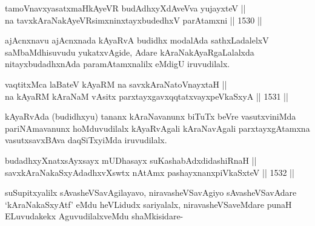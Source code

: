 
\begin{shl}
tamoVnavxyasatxmaHkAyeVR budAdhxyXdAveVva yujayxteV || \\
na tavxkAraNakAyeVR\s simxninxtayxbudedhxV parAtamxni \hfill || 1530 ||  
\end{shl}

\begin{artha}
ajAcnxnavu ajAcnxnada kAyaRvA budidhx modalAda sathxLadalelxV saMbaMdhisuvudu yukatxvAgide, Adare kAraNakAyaRgaLalalxda nitayxbudadhxnAda paramAtamxnalilx eMdigU iruvudilalx.
\end{artha}

\begin{shl}
vaqtitxM\footnotemark[1] ca laBateV kAyaRM na savxkAraNatoV\s nayxtaH ||  \\
na kAyaRM kAraNaM vA\s sitx parxtayxgavxqqtatxvayxpeVkaSxyA \hfill || 1531 ||  
\end{shl}

\begin{artha}
kAyaRvAda (budidhxyu) tananx kAraNavanunx biTuTx beVre vasutxviniMda pariNAmavanunx hoMduvudilalx kAyaRvAgali kAraNavAgali parxtayxgAtamxna vasutxsavxBAva daqSiTxyiMda iruvudilalx.
\end{artha}

\begin{shl}
budadhxyXnatxsAyxsayx mUDhasayx suKashabAdxdidashiRnaH || \\
savxkAraNakaSxyAdadhxvXswtx nA\s \s tAmx pashayxnanxpiVkaSxteV \hfill || 1532 ||  
\end{shl}
				
\begin{artha}
suSupitxyalilx sAvasheVSavAgilayavo, niravasheVSavAgiyo sAvasheVSavAdare `kAraNakaSxyAtf' eMdu heVLidudx sariyalalx, niravasheVSaveMdare punaH ELuvudakekx AguvudilalxveMdu shaMkisidare-
\end{artha}

